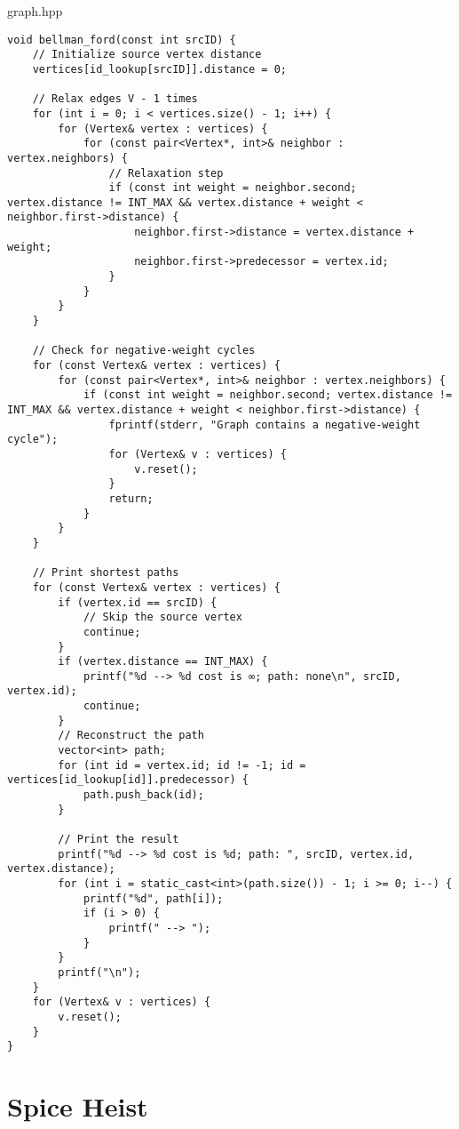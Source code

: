 \documentclass[letterpaper, 10pt,DIV=13]{scrartcl}
\numberwithin{equation}{section} %
\numberwithin{figure}{section} %
\numberwithin{table}{section} %
\begin{document}
graph.hpp
\begin{verbatim}
void bellman_ford(const int srcID) {
    // Initialize source vertex distance
    vertices[id_lookup[srcID]].distance = 0;
    
    // Relax edges V - 1 times
    for (int i = 0; i < vertices.size() - 1; i++) {
        for (Vertex& vertex : vertices) {
            for (const pair<Vertex*, int>& neighbor : vertex.neighbors) {
                // Relaxation step
                if (const int weight = neighbor.second; vertex.distance != INT_MAX && vertex.distance + weight < neighbor.first->distance) {
                    neighbor.first->distance = vertex.distance + weight;
                    neighbor.first->predecessor = vertex.id;
                }
            }
        }
    }

    // Check for negative-weight cycles
    for (const Vertex& vertex : vertices) {
        for (const pair<Vertex*, int>& neighbor : vertex.neighbors) {
            if (const int weight = neighbor.second; vertex.distance != INT_MAX && vertex.distance + weight < neighbor.first->distance) {
                fprintf(stderr, "Graph contains a negative-weight cycle");
                for (Vertex& v : vertices) {
                    v.reset();
                }
                return;
            }
        }
    }

    // Print shortest paths
    for (const Vertex& vertex : vertices) {
        if (vertex.id == srcID) {
            // Skip the source vertex
            continue;
        }
        if (vertex.distance == INT_MAX) {
            printf("%d --> %d cost is ∞; path: none\n", srcID, vertex.id);
            continue;
        }
        // Reconstruct the path
        vector<int> path;
        for (int id = vertex.id; id != -1; id = vertices[id_lookup[id]].predecessor) {
            path.push_back(id);
        }

        // Print the result
        printf("%d --> %d cost is %d; path: ", srcID, vertex.id, vertex.distance);
        for (int i = static_cast<int>(path.size()) - 1; i >= 0; i--) {
            printf("%d", path[i]);
            if (i > 0) {
                printf(" --> ");
            }
        }
        printf("\n");
    }
    for (Vertex& v : vertices) {
        v.reset();
    }
}
\end{verbatim}

\section{Spice Heist}
\end{document}

